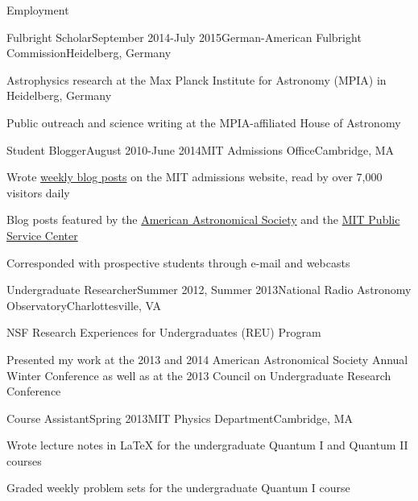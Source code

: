 \documentclass{resume} %
\begin{document}


\begin{rSection}{Employment}

\begin{rSubsection}{Fulbright Scholar}{September 2014-July 2015}{German-American Fulbright Commission}{Heidelberg, Germany}
\item Astrophysics research at the Max Planck Institute for Astronomy (MPIA) in Heidelberg, Germany
\item Public outreach and science writing at the MPIA-affiliated House of Astronomy
\end{rSubsection}

\begin{rSubsection}{Student Blogger}{August 2010-June 2014}{MIT Admissions Office}{Cambridge, MA}
\item Wrote \href{http://mitadmissions.org/blogs/author/annayq/archives}{weekly blog posts} on the MIT admissions website, read by over 7,000 visitors daily
\item Blog posts featured by the \href{https://aas.org/posts/blog/2014/04/congressional-visits-day-undergraduate-perspective}{American Astronomical Society} and the \href{http://web.mit.edu/mitpsc/pressroom/stories/ho.html}{MIT Public Service Center} %
\item Corresponded with prospective students through e-mail and webcasts
\end{rSubsection}

\begin{rSubsection}{Undergraduate Researcher}{Summer 2012, Summer 2013}{National Radio Astronomy Observatory}{Charlottesville, VA}
\item NSF Research Experiences for Undergraduates (REU) Program
\item Presented my work at the 2013 and 2014 American Astronomical Society Annual Winter Conference as well as at the 2013 Council on Undergraduate Research Conference
\end{rSubsection}

\begin{rSubsection}{Course Assistant}{Spring 2013}{MIT Physics Department}{Cambridge, MA}
\item Wrote lecture notes in LaTeX for the undergraduate Quantum I and Quantum II courses
\item Graded weekly problem sets for the undergraduate Quantum I course
\end{rSubsection}

\end{rSection}
\end{document}

